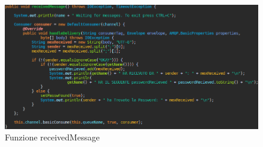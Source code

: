 \documentclass[a4paper,12pt,titlepage,oneside,openany]{book}
\begin{document}
\begin{figure}[H]
	\centering
	\includegraphics[scale=0.4]{receivedMessage.png}
	\caption{Funzione receivedMessage}
	\label{fig:receivedMessage}
\end{figure}







\end{document}
